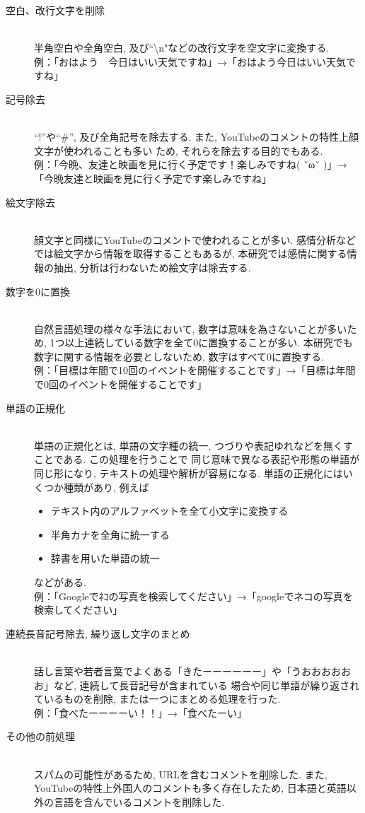 \documentclass{ltjarticle}
\begin{document}
\begin{description}
    \item[空白、改行文字を削除]\mbox{}\\
    半角空白や全角空白, 及び``\textbackslash n"などの改行文字を空文字に変換する.\\
    例：「おはよう　今日はいい天気ですね」→「おはよう今日はいい天気ですね」
    \item[記号除去]\mbox{}\\
    ``!''や``\#'', 及び全角記号を除去する. また, YouTubeのコメントの特性上顔文字が使われることも多い
    ため, それらを除去する目的でもある. \\
    例：「今晩、友達と映画を見に行く予定です！楽しみですね( ˇωˇ )」→「今晩友達と映画を見に行く予定です楽しみですね」
    \item[絵文字除去]\mbox{}\\
    顔文字と同様にYouTubeのコメントで使われることが多い. 感情分析などでは絵文字から情報を取得することもあるが, 
    本研究では感情に関する情報の抽出, 分析は行わないため絵文字は除去する. 
    \item[数字を0に置換]\mbox{}\\
    自然言語処理の様々な手法において, 数字は意味を為さないことが多いため, 
    1つ以上連続している数字を全て0に置換することが多い. 本研究でも数字に関する情報を必要としないため, 
    数字はすべて0に置換する. \\
    例：「目標は年間で10回のイベントを開催することです」→「目標は年間で0回のイベントを開催することです」
    \item[単語の正規化]\mbox{}\\
    単語の正規化とは, 単語の文字種の統一, つづりや表記ゆれなどを無くすことである. この処理を行うことで
    同じ意味で異なる表記や形態の単語が同じ形になり, テキストの処理や解析が容易になる. 
    単語の正規化にはいくつか種類があり, 例えば
    \begin{itemize}
        \item テキスト内のアルファベットを全て小文字に変換する
        \item 半角カナを全角に統一する
        \item 辞書を用いた単語の統一
    \end{itemize}
    などがある. \\
    例：「Googleでﾈｺの写真を検索してください」→「googleでネコの写真を検索してください」
    \newpage
    \item[連続長音記号除去, 繰り返し文字のまとめ]\mbox{}\\
    話し言葉や若者言葉でよくある「きたーーーーーー」や「うおおおおおお」など, 連続して長音記号が含まれている
    場合や同じ単語が繰り返されているものを削除, または一つにまとめる処理を行った. \\
    例：「食べたーーーーい！！」→「食べたーい」
    \item[その他の前処理]\mbox{}\\
    スパムの可能性があるため, URLを含むコメントを削除した. また, YouTubeの特性上外国人のコメントも多く存在したため, 
    日本語と英語以外の言語を含んでいるコメントを削除した. 
\end{description}
\end{document}
